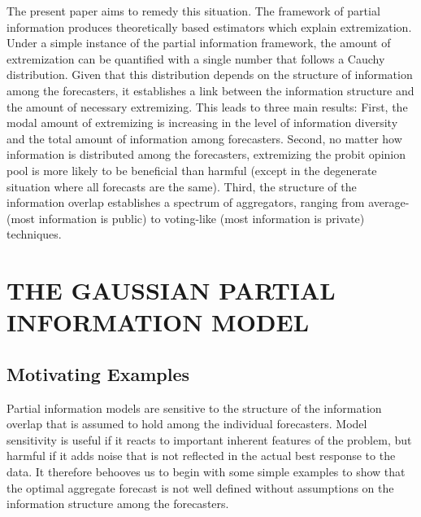 \documentclass[12pt]{article}
\theoremstyle{definition}
\theoremstyle{definition}
\begin{document}
The present paper aims to remedy this situation.  The framework of
partial information produces theoretically based estimators which
explain extremization. Under a simple instance of the partial
information framework, the amount of extremization can be quantified
with a single number that follows a Cauchy distribution.  Given that
this distribution depends on the structure of information among the
forecasters, it establishes a link between the information structure
and the amount of necessary extremizing.  This leads to three main results:  First, the modal
amount of extremizing is increasing in the level of information
diversity and the total amount of information among forecasters.
Second, no matter how information is distributed among the forecasters,
extremizing the probit opinion pool is more likely to be beneficial
than harmful (except in the degenerate situation where all forecasts
are the same). Third, the structure of the information overlap establishes a spectrum of aggregators, ranging from
average- (most information is public) to voting-like (most information
is private) techniques.

\section{THE GAUSSIAN PARTIAL INFORMATION MODEL}
\label{sec:model}
\subsection{Motivating Examples}
Partial information models are sensitive to the structure of the
information overlap that is assumed to hold among the individual
forecasters. Model sensitivity is useful if it reacts
to important inherent features of the problem, but harmful if it adds
noise that is not reflected in the actual best response to the data.
It therefore behooves us to begin with some simple examples to show
that the optimal aggregate forecast is not well defined without
assumptions on the information structure among the forecasters.
\end{document}
